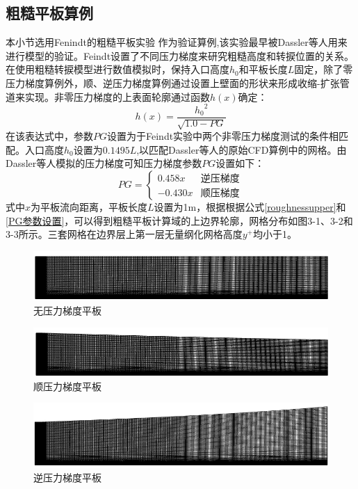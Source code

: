 \subsection{粗糙平板算例}
本小节选用Fenindt的粗糙平板实验 作为验证算例,该实验最早被Dassler等人用来进行模型的验证。Feindt设置了不同压力梯度来研究粗糙高度和转捩位置的关系。在使用粗糙转捩模型进行数值模拟时，保持入口高度$h_0$和平板长度$L$固定，除了零压力梯度算例外，顺、逆压力梯度算例通过设置上壁面的形状来形成收缩-扩张管道来实现。非零压力梯度的上表面轮廓通过函数$h(x)$确定：
\begin{equation} \label{roughnessupper}
h(x)=\frac{{h_0}^2}{\sqrt{1.0-PG}}
\end{equation}
在该表达式中，参数$PG$设置为于Feindt实验中两个非零压力梯度测试的条件相匹配。入口高度$h_0$设置为$0.1495L$,以匹配Dassler等人的原始CFD算例中的网格。由Dassler等人模拟的压力梯度可知压力梯度参数$PG$设置如下：
\begin{equation}
PG = \left\{ \begin{array}{rcl}
0.458x& \mbox{逆压梯度}
\\-0.430x & \mbox{顺压梯度}
\end{array}\right.
\label{PG参数设置}
\end{equation}
式中$x$为平板流向距离，平板长度$L$设置为1m，根据根据公式\autoref{roughnessupper}和 \ref{PG参数设置}，可以得到粗糙平板计算域的上边界轮廓，网格分布如图3-1、3-2和3-3所示。三套网格在边界层上第一层无量纲化网格高度$y^+$均小于1。
\begin{figure}[htbp]
	\centering
	\includegraphics[scale=1]{figures/zero_mesh.jpg}
	\caption{无压力梯度平板}
\end{figure}
\begin{figure}[htbp]
	\centering
	\includegraphics[scale=1]{figures/favorable_mesh.png}
	\caption{顺压力梯度平板}
\end{figure}
\begin{figure}[htbp]
	\centering
	\includegraphics[scale=1]{figures/adverse_mesh.png}
	\caption{逆压力梯度平板}
\end{figure}
